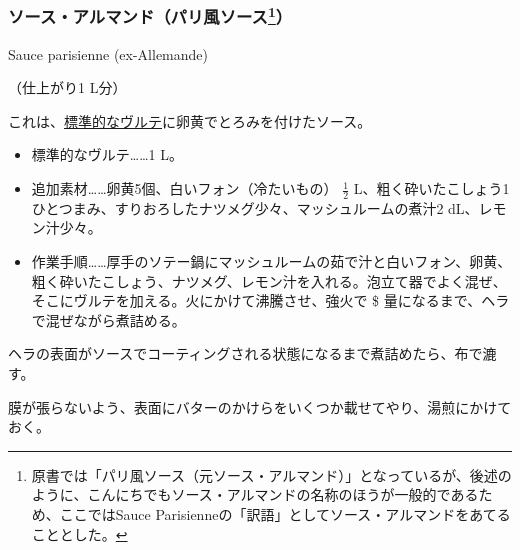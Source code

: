 \begin{recette}
\atoaki{}

\hypertarget{sauce-allemande}{%
\subsubsection[ソース・アルマンド（パリ風ソース）]{\texorpdfstring{ソース・アルマンド（パリ風ソース\footnote{原書では「パリ風ソース（元ソース・アルマンド）」となっているが、後述のように、こんにちでもソース・アルマンドの名称のほうが一般的であるため、ここではSauce
  Parisienneの「訳語」としてソース・アルマンドをあてることとした。}）}{ソース・アルマンド（パリ風ソース）}}\label{sauce-allemande}}

\begin{frsubenv}

Sauce parisienne (ex-Allemande)

\end{frsubenv}

 

（仕上がり1 L分）

これは、\protect\hyperlink{veloute}{標準的なヴルテ}に卵黄でとろみを付けたソース。

\begin{itemize}
\item
  標準的なヴルテ\ldots{}\ldots{}1 L。
\item
  追加素材\ldots{}\ldots{}卵黄5個、白いフォン（冷たいもの）
  \(\frac{1}{2}\)
  L、粗く砕いたこしょう1ひとつまみ、すりおろしたナツメグ少々、マッシュルームの煮汁2
  dL、レモン汁少々。
\item
  作業手順\ldots{}\ldots{}厚手のソテー鍋にマッシュルームの茹で汁と白いフォン、卵黄、粗く砕いたこしょう、ナツメグ、レモン汁を入れる。泡立て器でよく混ぜ、そこにヴルテを加える。火にかけて沸騰させ、強火で
  \$ 量になるまで、ヘラで混ぜながら煮詰める。
\end{itemize}

ヘラの表面がソースでコーティングされる状態になるまで煮詰めたら、布で漉す。

膜が張らないよう、表面にバターのかけらをいくつか載せてやり、湯煎にかけておく。


\end{recette}
